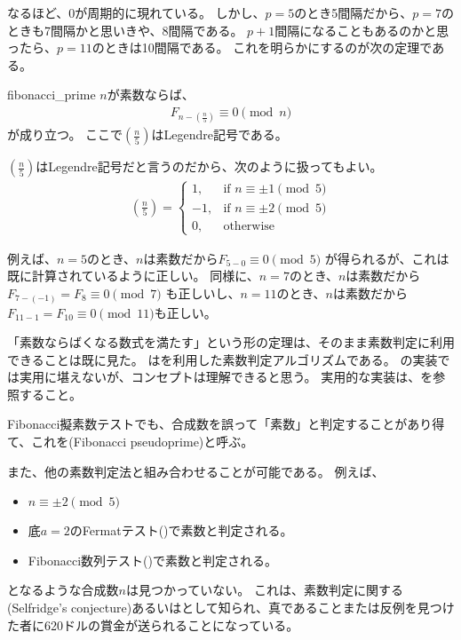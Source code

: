 なるほど、0が周期的に現れている。
しかし、$p=5$のとき5間隔だから、$p=7$のときも7間隔かと思いきや、8間隔である。
$p+1$間隔になることもあるのかと思ったら、$p=11$のときは10間隔である。
これを明らかにするのが次の定理である。

\begin{Theo}{}{fibonacci_prime}
$n$が素数ならば、
\begin{align*}
F_{n - \left(\frac{n}{5}\right)} \equiv 0 \pmod{n}
\end{align*}
が成り立つ。
ここで$\left(\frac{n}{5}\right)$はLegendre記号である。
\end{Theo}

$\left(\frac{n}{5}\right)$はLegendre記号だと言うのだから、次のように扱ってもよい。
\begin{align*}
\left(\frac{n}{5}\right) =
\begin{cases}
1, &\mbox{if }n \equiv \pm 1 \pmod{5}\\
-1, &\mbox{if }n \equiv \pm 2 \pmod{5}\\
0, &\mbox{otherwise}
\end{cases}
\end{align*}

例えば、$n=5$のとき、$n$は素数だから$F_{5 - 0} \equiv 0 \pmod{5}$
が得られるが、これは既に計算されているように正しい。
同様に、$n=7$のとき、$n$は素数だから
$F_{7 - (-1)} = F_{8} \equiv 0 \pmod{7}$
も正しいし、$n=11$のとき、$n$は素数だから
$F_{11 - 1} = F_{10} \equiv 0 \pmod{11}$も正しい。

「素数ならばくなる数式を満たす」という形の定理は、そのまま素数判定に利用できることは既に見た。
はを利用した素数判定アルゴリズムである。
の実装では実用に堪えないが、コンセプトは理解できると思う。
実用的な実装は、を参照すること。


Fibonacci擬素数テストでも、合成数を誤って「素数」と判定することがあり得て、これを(Fibonacci pseudoprime)と呼ぶ。

また、他の素数判定法と組み合わせることが可能である。
例えば、
\begin{itemize}
 \item $n \equiv \pm 2 \pmod{5}$
 \item 底$a=2$のFermatテスト()で素数と判定される。
 \item Fibonacci数列テスト()で素数と判定される。
\end{itemize}
となるような合成数$n$は見つかっていない。
これは、素数判定に関する(Selfridge's conjecture)あるいはとして知られ、真であることまたは反例を見つけた者に620ドルの賞金が送られることになっている\cite{A_Computational_Perspective}。

